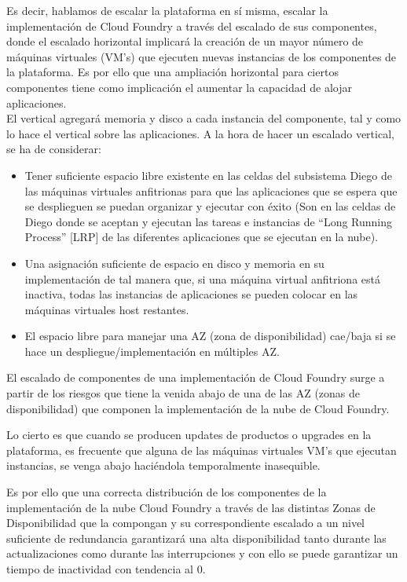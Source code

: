 \documentclass[a4paper,11pt]{article}
\begin{document}
Es decir, hablamos de escalar la plataforma en sí misma, escalar la implementación de Cloud Foundry a través del escalado de sus componentes, donde el escalado horizontal implicará la creación de un mayor número de máquinas virtuales (VM’s) que ejecuten nuevas instancias de los componentes de la plataforma.
Es por ello que una ampliación horizontal para ciertos componentes tiene como implicación el aumentar la capacidad de alojar aplicaciones.\\
El vertical agregará memoria y disco a cada instancia del componente, tal y como lo hace el vertical sobre las aplicaciones.
A la hora de hacer un escalado vertical, se ha de considerar:
\begin{itemize}
  \item Tener suficiente espacio libre existente en las celdas del subsistema Diego de las máquinas virtuales anfitrionas para que las aplicaciones que se espera que se desplieguen se puedan organizar y ejecutar con éxito (Son en las celdas de Diego donde se aceptan y ejecutan las tareas e instancias de “Long Running Process” [LRP] de las diferentes aplicaciones que se ejecutan en la nube).
\item Una asignación suficiente de espacio en disco y memoria en su implementación de tal manera que, si una máquina virtual anfitriona está inactiva, todas las instancias de aplicaciones se pueden colocar en las máquinas virtuales host restantes.
\item El espacio libre para manejar una AZ (zona de disponibilidad) cae/baja si se hace un despliegue/implementación en múltiples AZ.
\end{itemize}
El escalado de componentes de una implementación de Cloud Foundry surge a partir de los riesgos que tiene la venida abajo de una de las AZ (zonas de disponibilidad) que componen la implementación de la nube de Cloud Foundry.

Lo cierto es que cuando se producen updates de productos o upgrades en la plataforma, es frecuente que alguna de las máquinas virtuales VM’s que ejecutan instancias, se venga abajo haciéndola temporalmente inasequible.

Es por ello que una correcta distribución de los componentes de la implementación de la nube Cloud Foundry a través de las distintas Zonas de Disponibilidad que la compongan y su correspondiente escalado a un nivel suficiente de redundancia garantizará una alta disponibilidad tanto durante las actualizaciones como durante las interrupciones y con ello se puede garantizar un tiempo de inactividad con tendencia al 0.
\end{document}
